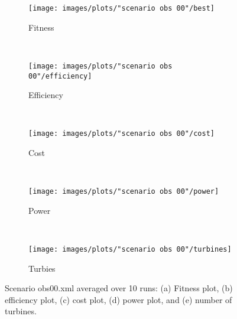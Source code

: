 \begin{figure}[h!]
    \centering
      \begin{subfigure}[b]{0.31\textwidth}
        \texttt{[image: images/plots/"scenario obs 00"/best]}
        \caption{Fitness}
        \hfill
        \label{plot:master slave model fitness plot scenario 00}
    \end{subfigure}
    ~
      \begin{subfigure}[b]{0.31\textwidth}
        \texttt{[image: images/plots/"scenario obs 00"/efficiency]}
        \caption{Efficiency}
        \hfill
        \label{plot:single point crossover}
    \end{subfigure}
    ~
    \begin{subfigure}[b]{0.31\textwidth}
        \texttt{[image: images/plots/"scenario obs 00"/cost]}
        \caption{Cost}
        \hfill
        \label{plot:single point crossover}
    \end{subfigure}
    ~
    \begin{subfigure}[b]{0.31\textwidth}
        \texttt{[image: images/plots/"scenario obs 00"/power]}
        \caption{Power}
        \hfill
        \label{plot:two point crossover}
    \end{subfigure}
    ~
    \begin{subfigure}[b]{0.31\textwidth}
        \texttt{[image: images/plots/"scenario obs 00"/turbines]}
        \caption{Turbies}
        \hfill
        \label{plot:uniform crossover}
    \end{subfigure}
    \caption{Scenario obs00.xml averaged over 10 runs: (a) Fitness plot, (b) efficiency plot, (c) cost plot, (d) power plot, and (e) number of turbines.}
    \label{plot:master slave scenario obs 00}
\end{figure}


